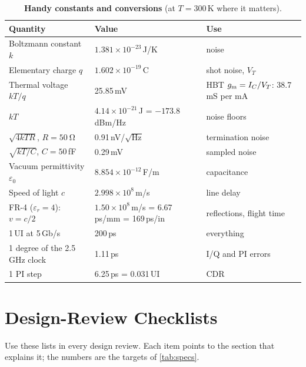 \begin{table}[htbp]
\centering
\caption{\textbf{Handy constants and \OS{} conversions} (at $T=300$\,K where it matters).}
\label{tab:app-const}
\small
\begin{tabularx}{\linewidth}{@{}l l L@{}}
\toprule
\textbf{Quantity} & \textbf{Value} & \textbf{Use}\\
\midrule
Boltzmann constant $k$ & $1.381\times10^{-23}$\,J/K & noise\\
Elementary charge $q$ & $1.602\times10^{-19}$\,C & shot noise, $V_T$\\
Thermal voltage $kT/q$ & 25.85\,mV & HBT $g_\mathrm{m}=I_C/V_T$: 38.7\,mS per mA\\
$kT$ & $4.14\times10^{-21}$\,J = $-173.8$\,dBm/Hz & noise floors\\
$\sqrt{4kTR}$, $R=\qty{50}{\ohm}$ & 0.91\,nV/$\sqrt{\mathrm{Hz}}$ & termination noise\\
$\sqrt{kT/C}$, $C=50$\,fF & 0.29\,mV & sampled noise\\
Vacuum permittivity $\varepsilon_0$ & $8.854\times10^{-12}$\,F/m & capacitance\\
Speed of light $c$ & $2.998\times10^8$\,m/s & line delay\\
FR-4 ($\varepsilon_r=4$): $v=c/2$ & $1.50\times10^8$\,m/s = 6.67\,ps/mm = 169\,ps/in & reflections, flight time\\
1\,UI at 5\,Gb/s & 200\,ps & everything\\
1 degree of the 2.5\,GHz clock & 1.11\,ps & I/Q and PI errors\\
1 PI step & 6.25\,ps = 0.031\,UI & CDR\\
\bottomrule
\end{tabularx}
\end{table}

\chapter{Design-Review Checklists}\label{app:checklists}

Use these lists in every design review. Each item points to the section that explains it; the numbers are the targets of \cref{tab:specs}.

